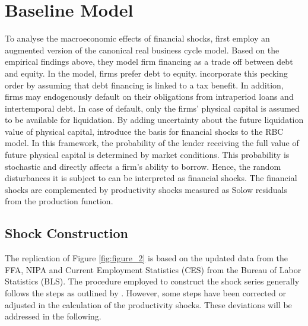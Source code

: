 \section{Baseline Model}
\label{sec:baseline_model}

To analyse the macroeconomic effects of financial shocks, \citeauthor{JERMANNfinancial} first employ an augmented version of the canonical real business cycle model. Based on the empirical findings above, they model firm financing as a trade off between debt and equity. In the model, firms prefer debt to equity. \citeauthor{JERMANNfinancial} incorporate this pecking order by assuming that debt financing is linked to a tax benefit. In addition, firms may endogenously default on their obligations from intraperiod loans and intertemporal debt. In case of default, only the firms' physical capital is assumed to be available for liquidation. By adding uncertainty about the future liquidation value of physical capital, \citeauthor{JERMANNfinancial} introduce the basis for financial shocks to the RBC model. In this framework, the probability of the lender receiving the full value of future physical capital is determined by market conditions. This probability is stochastic and directly affects a firm's ability to borrow. Hence, the random disturbances it is subject to can be interpreted as financial shocks. The financial shocks are complemented by productivity shocks measured as Solow residuals from the production function.


\subsection{Shock Construction}
\label{sec:shock_construction}



The replication of Figure \ref{fig:figure_2} is based on the updated data from the FFA, NIPA and Current Employment Statistics (CES) from the Bureau of Labor Statistics (BLS). The procedure employed to construct the shock series generally follows the steps as outlined by \citeauthor{JERMANNfinancial}. However, some steps have been corrected or adjusted in the calculation of the productivity shocks. These deviations will be addressed in the following. 

